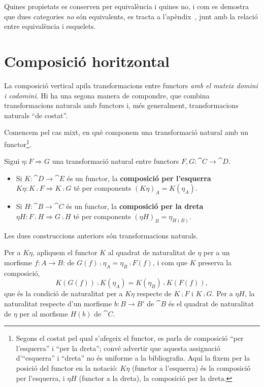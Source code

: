 Quines propietats es conserven per equivalència i quines no, i com es demostra que dues categories \emph{no} són equivalents, es tracta a l'apèndix~, junt amb la relació entre equivalència i esquelets.


\section{Composició horitzontal}

La composició vertical apila transformacions entre functors \emph{amb el mateix domini i codomini}. Hi ha una segona manera de compondre, que combina transformacions naturals amb functors i, més generalment, transformacions naturals \enquote{de costat}.

Comencem pel cas mixt, en què componem una transformació natural amb un functor\footnote{Segons el costat pel qual s'afegeix el functor, es parla de composició \enquote{per l'esquerra} i \enquote{per la dreta}; convé advertir que aquesta assignació d'\enquote{esquerra} i \enquote{dreta} no és uniforme a la bibliografia. Aquí la fixem per la posició del functor en la notació: $K\eta$ (functor a l'esquerra) és la composició per l'esquerra, i $\eta H$ (functor a la dreta), la composició per la dreta.}.

\begin{definicio}
Sigui $\eta\colon F\Rightarrow G$ una transformació natural entre functors $F,G\colon\cat{C}\to\cat{D}$.
\begin{itemize}
\item Si $K\colon\cat{D}\to\cat{E}$ és un functor, la \textbf{composició per l'esquerra} $K\eta\colon K\comp F\Rightarrow K\comp G$ té per components $(K\eta)_A=K(\eta_A)$.
\item Si $H\colon\cat{B}\to\cat{C}$ és un functor, la \textbf{composició per la dreta} $\eta H\colon F\comp H\Rightarrow G\comp H$ té per components $(\eta H)_B=\eta_{H(B)}$.
\end{itemize}
\end{definicio}

\begin{proposicio}
Les dues construccions anteriors són transformacions naturals.
\end{proposicio}

\begin{prova}
Per a $K\eta$, apliquem el functor $K$ al quadrat de naturalitat de $\eta$ per a un morfisme $f\colon A\to B$: de $G(f)\comp\eta_A=\eta_B\comp F(f)$, i com que $K$ preserva la composició,
\[
K(G(f))\comp K(\eta_A)=K(\eta_B)\comp K(F(f)),
\]
que és la condició de naturalitat per a $K\eta$ respecte de $K\comp F$ i $K\comp G$. Per a $\eta H$, la naturalitat respecte d'un morfisme $b\colon B\to B'$ de $\cat{B}$ és el quadrat de naturalitat de $\eta$ per al morfisme $H(b)$ de $\cat{C}$.
\end{prova}

